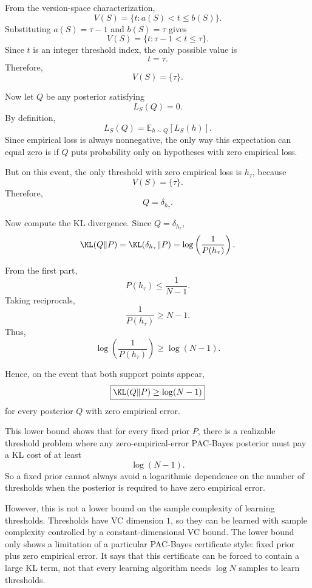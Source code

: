 \documentclass[11pt]{article}
\begin{document}
\begin{solutionbox}
From the version-space characterization,
\[
V(S)=\{t:a(S)<t\le b(S)\}.
\]
Substituting $a(S)=\tau-1$ and $b(S)=\tau$ gives
\[
V(S)
=
\{t:\tau-1<t\le \tau\}.
\]
Since $t$ is an integer threshold index, the only possible value is
\[
t=\tau.
\]
Therefore,
\[
\boxed{
V(S)=\{\tau\}.
}
\]

Now let $Q$ be any posterior satisfying
\[
L_S(Q)=0.
\]
By definition,
\[
L_S(Q)
=
\mathbb E_{h\sim Q}[L_S(h)].
\]
Since empirical loss is always nonnegative, the only way this expectation can equal zero is if $Q$ puts probability only on hypotheses with zero empirical loss.

But on this event, the only threshold with zero empirical loss is $h_\tau$, because
\[
V(S)=\{\tau\}.
\]
Therefore,
\[
\boxed{
Q=\delta_{h_\tau}.
}
\]

Now compute the KL divergence. Since $Q=\delta_{h_\tau}$,
\[
\KL(Q\|P)
=
\KL(\delta_{h_\tau}\|P)
=
\log\left(\frac{1}{P(h_\tau)}\right).
\]

From the first part,
\[
P(h_\tau)\le \frac{1}{N-1}.
\]
Taking reciprocals,
\[
\frac{1}{P(h_\tau)}
\ge
N-1.
\]
Thus,
\[
\log\left(\frac{1}{P(h_\tau)}\right)
\ge
\log(N-1).
\]

Hence, on the event that both support points appear,
\[
\boxed{
\KL(Q\|P)\ge \log(N-1)
}
\]
for every posterior $Q$ with zero empirical error.

This lower bound shows that for every fixed prior $P$, there is a realizable threshold problem where any zero-empirical-error PAC-Bayes posterior must pay a KL cost of at least
\[
\log(N-1).
\]
So a fixed prior cannot always avoid a logarithmic dependence on the number of thresholds when the posterior is required to have zero empirical error.

However, this is not a lower bound on the sample complexity of learning thresholds. Thresholds have VC dimension $1$, so they can be learned with sample complexity controlled by a constant-dimensional VC bound. The lower bound only shows a limitation of a particular PAC-Bayes certificate style: fixed prior plus zero empirical error. It says that this certificate can be forced to contain a large KL term, not that every learning algorithm needs $\log N$ samples to learn thresholds.

\end{solutionbox}

\end{document}
